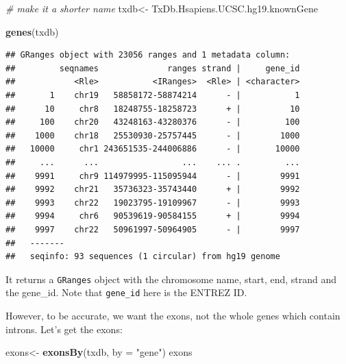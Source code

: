 \documentclass[
]{book}
\newenvironment{Shaded}{\begin{snugshade}}{\end{snugshade}}
\newcommand{\AttributeTok}[1]{\textcolor[rgb]{0.13,0.29,0.53}{#1}}
\newcommand{\CommentTok}[1]{\textcolor[rgb]{0.56,0.35,0.01}{\textit{#1}}}
\newcommand{\FunctionTok}[1]{\textcolor[rgb]{0.13,0.29,0.53}{\textbf{#1}}}
\newcommand{\NormalTok}[1]{#1}
\newcommand{\OtherTok}[1]{\textcolor[rgb]{0.56,0.35,0.01}{#1}}
\newcommand{\StringTok}[1]{\textcolor[rgb]{0.31,0.60,0.02}{#1}}
\begin{document}
\begin{Shaded}
\begin{Highlighting}[]
\CommentTok{\# make it a shorter name}
\NormalTok{txdb}\OtherTok{\textless{}{-}}\NormalTok{ TxDb.Hsapiens.UCSC.hg19.knownGene}

\FunctionTok{genes}\NormalTok{(txdb)}
\end{Highlighting}
\end{Shaded}

\begin{verbatim}
## GRanges object with 23056 ranges and 1 metadata column:
##         seqnames              ranges strand |     gene_id
##            <Rle>           <IRanges>  <Rle> | <character>
##       1    chr19   58858172-58874214      - |           1
##      10     chr8   18248755-18258723      + |          10
##     100    chr20   43248163-43280376      - |         100
##    1000    chr18   25530930-25757445      - |        1000
##   10000     chr1 243651535-244006886      - |       10000
##     ...      ...                 ...    ... .         ...
##    9991     chr9 114979995-115095944      - |        9991
##    9992    chr21   35736323-35743440      + |        9992
##    9993    chr22   19023795-19109967      - |        9993
##    9994     chr6   90539619-90584155      + |        9994
##    9997    chr22   50961997-50964905      - |        9997
##   -------
##   seqinfo: 93 sequences (1 circular) from hg19 genome
\end{verbatim}

It returns a \texttt{GRanges} object with the chromosome name, start, end, strand and the gene\_id. Note that \texttt{gene\_id} here is the ENTREZ ID.

However, to be accurate, we want the exons, not the whole genes which contain introns. Let's get the exons:

\begin{Shaded}
\begin{Highlighting}[]
\NormalTok{exons}\OtherTok{\textless{}{-}} \FunctionTok{exonsBy}\NormalTok{(txdb, }\AttributeTok{by =} \StringTok{"gene"}\NormalTok{)}
\NormalTok{exons}
\end{Highlighting}
\end{Shaded}
\end{document}
